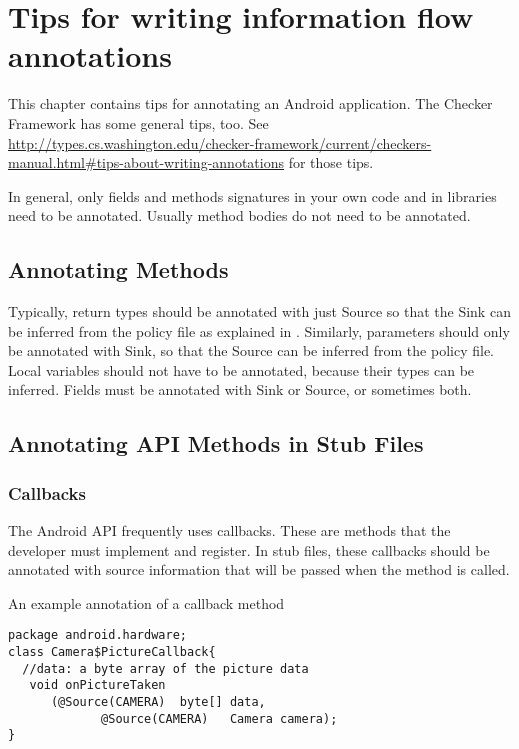 \htmlhr
\chapter{Tips for writing information flow annotations\label{app-annotation}}

This chapter contains tips for annotating an Android application.  The Checker
Framework has some general tips, too.  See \url{http://types.cs.washington.edu/checker-framework/current/checkers-manual.html#tips-about-writing-annotations} for those tips.

In general, only fields and methods signatures in your own code and in
libraries need to be annotated. Usually method bodies do not need to be
annotated.


\section{Annotating  Methods\label{sec:annomethods}}

Typically, return types should be annotated with just Source so that the Sink can be
 inferred from the policy file as explained in . Similarly, parameters should
  only be annotated with Sink, so that the Source can be inferred from  the policy file.
    Local variables should not have to be annotated, because their types can be inferred. Fields 
    must be annotated with  Sink or Source, or sometimes both. 

\section{Annotating API Methods in Stub Files\label{sec:annoAPI}}

\subsection{Callbacks}
The Android API frequently uses callbacks.  These are methods that the developer must 
implement and register.  In stub files, these callbacks should be annotated
with source information that will be passed when the method is called.  

An example annotation of a callback method
\begin{Verbatim}
package android.hardware;
class Camera$PictureCallback{
  //data: a byte array of the picture data
   void onPictureTaken 
      (@Source(CAMERA)  byte[] data, 
             @Source(CAMERA)   Camera camera);
}
\end{Verbatim}

